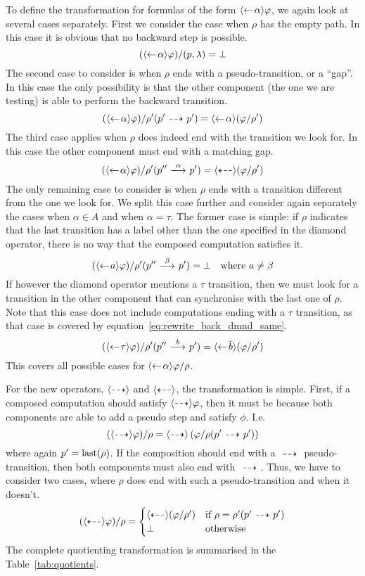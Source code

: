 To define the transformation for formulas of the form $\mbox{\ensuremath{\langle\leftarrow\! \alpha \rangle}}\varphi$, we
again look at several cases separately. First we consider the case when $\rho$ has
the empty path. In this case it is obvious that no backward step is possible.
\[
    (\mbox{\ensuremath{\langle\leftarrow\! \alpha \rangle}}\varphi) / (p,\lambda) = \bot
\]
The second case to consider is when $\rho$ ends with a pseudo-transition, or a ``gap''.
In this case the only possibility is that the other component (the one we are testing)
is able to perform the backward transition.
\[
    (\mbox{\ensuremath{\langle\leftarrow\! \alpha \rangle}}\varphi) / \rho'(p'\ {\stackrel{_{}}{\dashrightarrow}}\  p') =
        \mbox{\ensuremath{\langle\leftarrow\! \alpha \rangle}} (\varphi / \rho')
\]
The third case applies when $\rho$ does indeed end with the transition we look for.
In this case the other component must end with a matching gap.
\begin{equation}\label{eq:rewrite_back_dmnd_same}
    (\mbox{\ensuremath{\langle\leftarrow\! \alpha \rangle}}\varphi) / \rho'(p''\ {\stackrel{{\alpha}}{\longrightarrow}}\  p') = \mbox{\ensuremath{\langle\stackrel{_{}}{\dashleftarrow}\rangle}} (\varphi / \rho')
\end{equation}
The only remaining case to consider is when $\rho$ ends with a transition different from
the one we look for. We split this case further and consider
again separately the cases when $\alpha\in A$ and when $\alpha = \tau$. The former case
is simple: if $\rho$ indicates that the last transition has a label other than the one
specified
in the diamond operator, there is no way that the composed computation satisfies it.
\[
    (\mbox{\ensuremath{\langle\leftarrow\! a \rangle}}\varphi) / \rho'(p'' \ {\stackrel{{\beta}}{\longrightarrow}}\  p') = \bot \quad\textrm{where $a\ne \beta$}
\]
If however the diamond operator mentions a $\tau$ transition, then we must look for a
transition in the other component that can synchronise with the last one of $\rho$. Note that this
case does not include computations ending with a $\tau$ transition, as that case is
covered by equation~\ref{eq:rewrite_back_dmnd_same}.
\[
    (\mbox{\ensuremath{\langle\leftarrow\! \tau \rangle}}\varphi) / \rho'(p'' \ {\stackrel{{b}}{\longrightarrow}}\  p') = \mbox{\ensuremath{\langle\leftarrow\! \bar{b} \rangle}} (\varphi/\rho')
\]
This covers all possible cases for $\mbox{\ensuremath{\langle\leftarrow\! \alpha \rangle}}\varphi / \rho$.

For the new operators, $\mbox{\ensuremath{\langle\stackrel{_{}}{\dashrightarrow}\rangle}}$ and $\mbox{\ensuremath{\langle\stackrel{_{}}{\dashleftarrow}\rangle}}$, the transformation is simple.
First, if a composed computation should satisfy $\mbox{\ensuremath{\langle\stackrel{_{}}{\dashrightarrow}\rangle}}\varphi$, then it must be
because both components are able to add a pseudo step and satisfy $\phi$. I.e.
\[
    (\mbox{\ensuremath{\langle\stackrel{_{}}{\dashrightarrow}\rangle}}\varphi) / \rho = \mbox{\ensuremath{\langle\stackrel{_{}}{\dashrightarrow}\rangle}} \left( \varphi / \rho(p'\ {\stackrel{_{}}{\dashrightarrow}}\  p') \right)
\]
where again $p' = \operatorname{last}(\rho)$. If the composition should end with a $\ {\stackrel{_{}}{\dashrightarrow}}\ $
pseudo-transition, then both components must also end with $\ {\stackrel{_{}}{\dashrightarrow}}\ $. Thus, we
have to consider two cases, where $\rho$ does end with such a pseudo-transition
and when it doesn't.
\[
    (\mbox{\ensuremath{\langle\stackrel{_{}}{\dashleftarrow}\rangle}}\varphi) / \rho = \begin{cases}
        \mbox{\ensuremath{\langle\stackrel{_{}}{\dashleftarrow}\rangle}} (\varphi / \rho') & \textrm{if $\rho = \rho'(p' \ {\stackrel{_{}}{\dashrightarrow}}\  p')$} \\
        \bot & \textrm{otherwise}
    \end{cases}
\]
%
The complete quotienting transformation is summarised in the Table~\ref{tab:quotients}.

